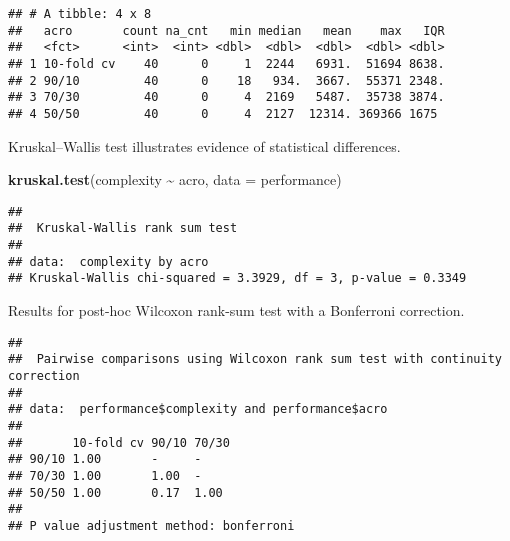 \documentclass[
]{book}
\newenvironment{Shaded}{\begin{snugshade}}{\end{snugshade}}
\newcommand{\AttributeTok}[1]{\textcolor[rgb]{0.13,0.29,0.53}{#1}}
\newcommand{\ConstantTok}[1]{\textcolor[rgb]{0.56,0.35,0.01}{#1}}
\newcommand{\FunctionTok}[1]{\textcolor[rgb]{0.13,0.29,0.53}{\textbf{#1}}}
\newcommand{\NormalTok}[1]{#1}
\newcommand{\SpecialCharTok}[1]{\textcolor[rgb]{0.81,0.36,0.00}{\textbf{#1}}}
\newcommand{\StringTok}[1]{\textcolor[rgb]{0.31,0.60,0.02}{#1}}
\begin{document}
\begin{verbatim}
## # A tibble: 4 x 8
##   acro       count na_cnt   min median   mean    max   IQR
##   <fct>      <int>  <int> <dbl>  <dbl>  <dbl>  <dbl> <dbl>
## 1 10-fold cv    40      0     1  2244   6931.  51694 8638.
## 2 90/10         40      0    18   934.  3667.  55371 2348.
## 3 70/30         40      0     4  2169   5487.  35738 3874.
## 4 50/50         40      0     4  2127  12314. 369366 1675
\end{verbatim}

Kruskal--Wallis test illustrates evidence of statistical differences.

\begin{Shaded}
\begin{Highlighting}[]
\FunctionTok{kruskal.test}\NormalTok{(complexity }\SpecialCharTok{\textasciitilde{}}\NormalTok{ acro, }\AttributeTok{data =}\NormalTok{ performance)}
\end{Highlighting}
\end{Shaded}

\begin{verbatim}
## 
##  Kruskal-Wallis rank sum test
## 
## data:  complexity by acro
## Kruskal-Wallis chi-squared = 3.3929, df = 3, p-value = 0.3349
\end{verbatim}

Results for post-hoc Wilcoxon rank-sum test with a Bonferroni correction.

\begin{Shaded}
\end{Shaded}

\begin{verbatim}
## 
##  Pairwise comparisons using Wilcoxon rank sum test with continuity correction 
## 
## data:  performance$complexity and performance$acro 
## 
##       10-fold cv 90/10 70/30
## 90/10 1.00       -     -    
## 70/30 1.00       1.00  -    
## 50/50 1.00       0.17  1.00 
## 
## P value adjustment method: bonferroni
\end{verbatim}
\end{document}
